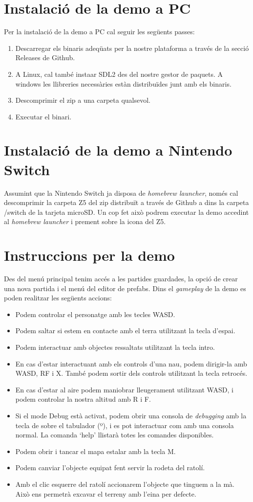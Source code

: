 \section{Instalació de la demo a PC}
Per la instalació de la demo a PC cal seguir les següents passes:
\begin{enumerate}
  \item Descarregar els binaris adeqüats per la nostre plataforma a través de la secció Releases de Github.
  \item A Linux, cal també insta\lgem ar SDL2 des del nostre gestor de paquets. A windows les llibreries necessàries estàn distribuïdes junt amb els binaris.
  \item Descomprimir el zip a una carpeta qualsevol.
  \item Executar el binari.
\end{enumerate}
\section{Instalació de la demo a Nintendo Switch}
Assumint que la Nintendo Switch ja disposa de \textit{homebrew launcher}, només cal descomprimir la carpeta Z5 del zip distribuït a través de Github a dins la carpeta /switch de la tarjeta microSD\@.
Un cop fet això podrem executar la demo accedint al \textit{homebrew launcher} i prement sobre la icona del Z5.
\section{Instruccions per la demo}
Des del menú principal tenim accés a les partides guardades, la opció de crear una nova partida i el menú del editor de prefabs.
Dins el \textit{gameplay} de la demo es poden realitzar les següents accions:
\begin{itemize}
  \item Podem controlar el personatge amb les tecles WASD.
  \item Podem saltar si estem en contacte amb el terra utilitzant la tecla d'espai.
  \item Podem interactuar amb objectes ressaltats utilitzant la tecla intro.
  \item En cas d'estar interactuant amb els controls d'una nau, podem dirigir-la amb WASD, RF i X. També podem sortir dels controls utilitzant la tecla retrocés.
  \item En cas d'estar al aire podem maniobrar lleugerament utilitzant WASD, i podem controlar la nostra altitud amb R i F.
  \item Si el mode Debug està activat, podem obrir una consola de \textit{debugging} amb la tecla de sobre el tabulador (º), i es pot interactuar com amb una consola normal. La comanda `help' llistarà totes les comandes disponibles.
  \item Podem obrir i tancar el mapa estalar amb la tecla M.
  \item Podem canviar l'objecte equipat fent servir la rodeta del ratolí.
  \item Amb el clic esquerre del ratolí accionarem l'objecte que tinguem a la mà. Això ens permetrà excavar el terreny amb l'eina per defecte.
\end{itemize}
